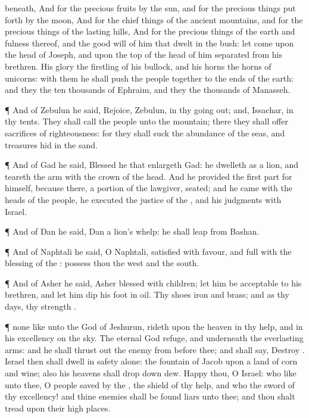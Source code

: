 {beneath,
And for the
precious
fruits
{} by the
sun, and for the precious
things put
forth by the
moon,
And for the chief
things of the
ancient
mountains, and for the precious
things of the
lasting
hills,
And for the precious
things of the
earth and
fulness thereof, and
{} the good
will of him that
dwelt in the
bush: let
{}
come upon the
head of
Joseph, and upon the top of the
head of him
{}
separated from his
brethren.
His
glory
{} the
firstling of his
bullock, and his
horns
{} the
horns of
unicorns: with them he shall
push the
people
together to the
ends of the
earth: and they
{} the ten
thousands of
Ephraim, and they
{} the
thousands of
Manasseh.
\par }{\PP {}¶ And of
Zebulun he
said,
Rejoice,
Zebulun, in thy going
out; and,
Issachar, in thy
tents.
They shall
call the
people unto the
mountain; there they shall
offer
sacrifices of
righteousness: for they shall
suck
{} the
abundance of the
seas, and
{}
treasures
hid in the
sand.
\par }{\PP {}¶ And of
Gad he
said,
Blessed
{} he that
enlargeth
Gad: he
dwelleth as a
lion, and
teareth the
arm
with the crown of the
head.
And he
provided the first
part for himself, because there,
{} a
portion of the
lawgiver,
{}
seated; and he
came with the
heads of the
people, he
executed the
justice of the
{}, and his
judgments with
Israel.
\par }{\PP {}¶ And of
Dan he
said,
Dan
{} a
lion’s
whelp: he shall
leap from
Bashan.
\par }{\PP {}¶ And of
Naphtali he
said, O
Naphtali,
satisfied with
favour, and
full with the
blessing of the
{}:
possess thou the
west and the
south.
\par }{\PP {}¶ And of
Asher he
said,
{}
Asher
{}
blessed with
children; let him be
acceptable to his
brethren, and let him
dip his
foot in
oil.
Thy
shoes
{}
iron and
brass; and as thy
days,
{} thy
strength
{}.
\par }{\PP {}¶
{} none like unto the
God of
Jeshurun,
{}
rideth upon the
heaven in thy
help, and in his
excellency on the
sky.
The
eternal
God
{}
refuge, and underneath
{} the
everlasting
arms: and he shall thrust
out the
enemy from
before thee; and shall
say,
Destroy
{}.
Israel then shall
dwell in
safety
alone: the
fountain of
Jacob
{} upon a
land of
corn and
wine; also his
heavens shall drop
down
dew.
Happy
{} thou, O
Israel: who
{} like unto thee, O
people
saved by the
{}, the
shield of thy
help, and who
{} the
sword of thy
excellency! and thine
enemies shall be found
liars unto thee; and thou shalt
tread upon their high
places.

}
